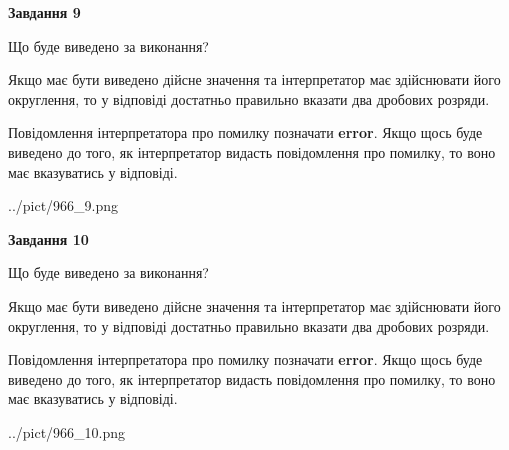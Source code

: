 \documentclass[12pt, ukrainian]{article}
\begin{document}
{\begin {Large}
{\begin {center}\textbf{Завдання 9}\end {center}}\par
Що буде виведено за виконання? \par

Якщо має бути виведено дійсне значення та інтерпретатор має здійснювати його округлення, 
то у відповіді достатньо правильно вказати два дробових розряди.

Повідомлення інтерпретатора про помилку позначати \textbf{error}.
Якщо щось буде виведено до того, як інтерпретатор видасть повідомлення про помилку, 
то воно має вказуватись у відповіді. \par

\begin{center}
	{../pict/966_9.png}
\end{center}
\newpage

{\begin {center}\textbf{Завдання 10}\end {center}}\par
Що буде виведено за виконання? \par

Якщо має бути виведено дійсне значення та інтерпретатор має здійснювати його округлення, 
то у відповіді достатньо правильно вказати два дробових розряди.

Повідомлення інтерпретатора про помилку позначати \textbf{error}.
Якщо щось буде виведено до того, як інтерпретатор видасть повідомлення про помилку, 
то воно має вказуватись у відповіді. \par

\begin{center}
	{../pict/966_10.png}
\end{center}
\newpage

\end {Large}}
\end{document}
